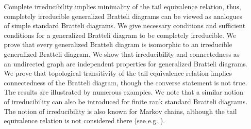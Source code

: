\documentclass[11pt, twoside]{amsart}
\theoremstyle{definition}
\theoremstyle{remark}
\theoremstyle{plain}
\newcommand{\tcr}{\textcolor{red}}
\numberwithin{equation}{section}
\begin{document}
Complete irreducibility implies minimality of the tail equivalence relation, thus, completely irreducible generalized Bratteli diagrams can be viewed as analogues of simple standard Bratteli diagrams.
We give necessary conditions and sufficient conditions  for a generalized Bratteli diagram to be completely irreducible. 
We prove that every  generalized Bratteli diagram is isomorphic to an irreducible generalized Bratteli diagram. 
We show that irreducibility and connectedness as an undirected graph are independent properties for generalized Bratteli diagrams. We prove that topological transitivity of the tail equivalence relation implies connectedness of the Bratteli diagram, though the converse statement is not true.
The results are illustrated by numerous examples. We note that a similar notion of irreducibility can also be introduced for finite rank standard Bratteli diagrams. The notion of irreducibility is also known for Markov chains, although the tail equivalence relation is not considered there (see e.g. \cite{Seneta2006}).












\end{document}
